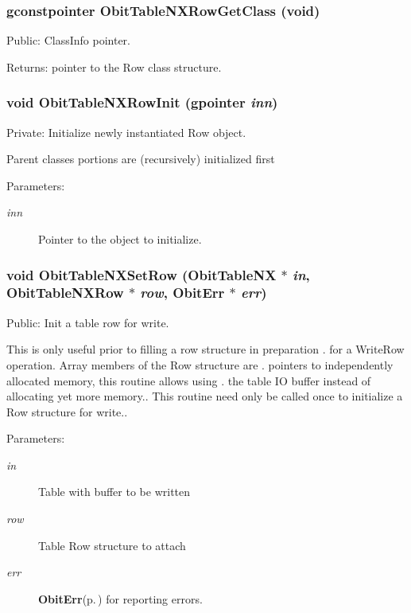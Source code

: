 \subsubsection{\setlength{\rightskip}{0pt plus 5cm}gconstpointer Obit\-Table\-NXRow\-Get\-Class (void)}\label{ObitTableNX_8c_a15}


Public: Class\-Info pointer. 

\begin{Desc}
\item[Returns:]pointer to the Row class structure. \end{Desc}
\subsubsection{\setlength{\rightskip}{0pt plus 5cm}void Obit\-Table\-NXRow\-Init (gpointer {\em inn})}\label{ObitTableNX_8c_a6}


Private: Initialize newly instantiated Row object. 

Parent classes portions are (recursively) initialized first \begin{Desc}
\item[Parameters:]
\begin{description}
\item[{\em inn}]Pointer to the object to initialize. \end{description}
\end{Desc}
\subsubsection{\setlength{\rightskip}{0pt plus 5cm}void Obit\-Table\-NXSet\-Row ({\bf Obit\-Table\-NX} $\ast$ {\em in}, {\bf Obit\-Table\-NXRow} $\ast$ {\em row}, {\bf Obit\-Err} $\ast$ {\em err})}\label{ObitTableNX_8c_a23}


Public: Init a table row for write. 

This is only useful prior to filling a row structure in preparation . for a Write\-Row operation. Array members of the Row structure are . pointers to independently allocated memory, this routine allows using . the table IO buffer instead of allocating yet more memory.. This routine need only be called once to initialize a Row structure for write.. \begin{Desc}
\item[Parameters:]
\begin{description}
\item[{\em in}]Table with buffer to be written \item[{\em row}]Table Row structure to attach \item[{\em err}]{\bf Obit\-Err}{\rm (p.\,\pageref{structObitErr})} for reporting errors. \end{description}
\end{Desc}
